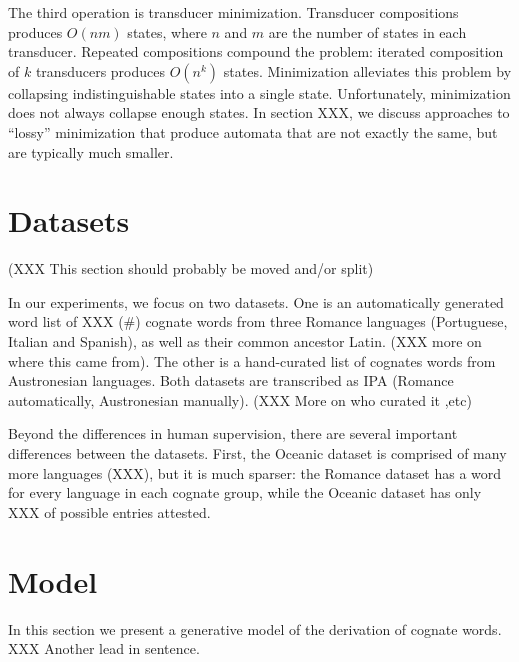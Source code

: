 \documentclass[11pt,a4paper]{article}
\begin{document}
The third operation is transducer minimization. Transducer compositions
produces $O(nm)$ states, where $n$ and $m$ are the number of states
in each transducer. Repeated compositions compound the problem:
iterated composition of $k$ transducers produces $O(n^k)$ states.
Minimization alleviates this problem by collapsing indistinguishable
states into a single state. Unfortunately, minimization does not
always collapse enough states. In section XXX, we discuss approaches
to ``lossy'' minimization that produce automata that are not exactly
the same, but are typically much smaller.

\section{Datasets}

(XXX This section should probably be moved and/or split)

In our experiments, we focus on two datasets. One is an automatically
generated word list of XXX (\#) cognate words from three Romance
languages (Portuguese, Italian and Spanish), as well as their common
ancestor Latin. (XXX more on where this came from). The other is a
hand-curated list of cognates words from Austronesian languages.
Both datasets are transcribed as IPA (Romance automatically,
Austronesian manually). (XXX More on who curated it ,etc)

Beyond the differences in human supervision, there are several
important differences between the datasets. First, the Oceanic
dataset is comprised of many more languages (XXX), but it is much
sparser: the Romance dataset has a word for every language in each
cognate group, while the Oceanic dataset has only XXX of possible
entries attested.

\section{Model}

In this section we present a generative model of the derivation of
cognate words. XXX Another lead in sentence.
\end{document}
